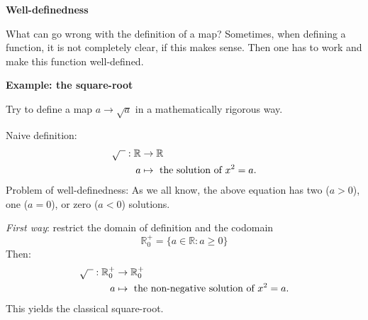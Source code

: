 \textbf{Well-definedness}

What can go wrong with the definition of a map? 
Sometimes, when defining a function, it is not completely clear, if this makes sense. 
Then one has to work and make this function well-defined. 

\textbf{Example: the square-root}

Try to define a map $a \to \sqrt{a}$ in a mathematically rigorous way.

Naive definition:
\begin{align*}
 \sqrt{\hphantom{x}} : \mathbb{R} &\to \mathbb{R}\\
         a &\mapsto \mbox{ the solution of } x^2=a.
\end{align*}
Problem of well-definedness: As we all know, the above equation has two ($a>0$), one ($a=0$), or zero ($a<0$) solutions.

\emph{First way}: restrict the domain of definition and the codomain
\[
 \mathbb{R}^+_0 =  \{ a \in \mathbb{R}: a \ge 0 \}
\]
Then:
\begin{align*}
 \sqrt{\hphantom{x}} : \mathbb{R}^+_0 &\to \mathbb{R}^+_0\\
         a &\mapsto  \mbox{ the non-negative solution of } x^2=a.
\end{align*}
This yields the classical square-root. 
